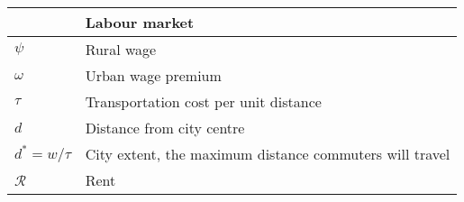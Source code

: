 \begin{longtable}{lp{10cm}}
\hline           &  \textbf{Labour market}      \\ \hline %
$\psi$           &  Rural wage                  \\ %
$\omega$         &  Urban wage premium          \\
$\tau$           &  Transportation cost per unit distance \\
$d$              &  Distance from city centre   \\
$d^* = w/\tau$   &  City extent, the maximum distance commuters will travel                 \\ %
$\mathcal{R}$    &  Rent                        \\ 


\end{longtable}
